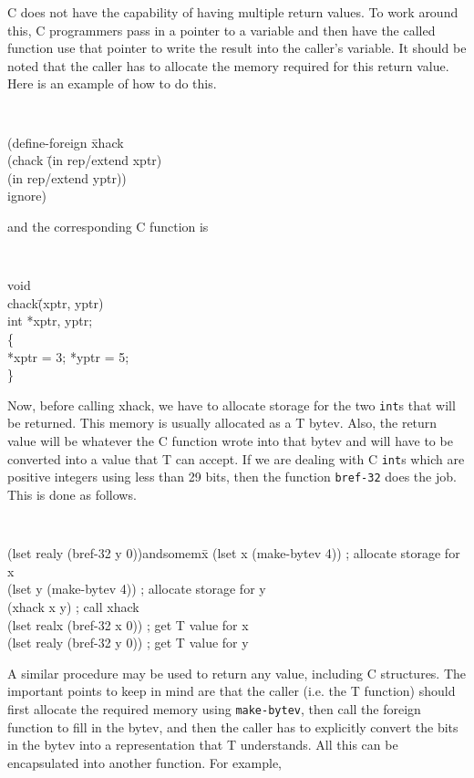 C does not have the capability of having multiple return values.
To work around this, C programmers pass in a pointer to a
variable and then have the called function use that pointer to write
the result into the caller's variable.
It should be noted that the caller has to allocate the memory required
for this return value.
Here is an example of how to do this.

\horizline
{\tt
\begin{tabbing}
(define-foreign \= xhack\+ \\
	(chack \= (in rep/extend xptr)\+ \\
		(in rep/extend yptr))\- \\
	ignore)
\end{tabbing}
}
\horizline

and the corresponding C function is

\horizline
{\tt
\begin{tabbing}
void\\
chack\= (xptr, yptr)\\
	\> int *xptr, yptr;\\
\{\\
	\> *xptr = 3; *yptr = 5;\\
\}
\end{tabbing}
}
\horizline

Now, before calling xhack, we have to allocate storage for the two
{\tt int}s that will be returned.
This memory is usually allocated as a T bytev.
Also, the return value will be whatever the C function wrote into that
bytev and will have to be converted into a value that T can accept.
If we are dealing with C {\tt int}s which are positive integers using
less than 29 bits, then the function {\tt bref-32} does the job.
This is done as follows.

\horizline
{\tt
\begin{tabbing}
(lset realy (bref-32 y 0))andsomemx\= \kill
(lset x (make-bytev 4))		\> ; allocate storage for x\\
(lset y (make-bytev 4))		\> ; allocate storage for y\\
(xhack x y)			\> ; call xhack\\
(lset realx (bref-32 x 0))	\> ; get T value for x\\
(lset realy (bref-32 y 0))	\> ; get T value for y
\end{tabbing}
}
\horizline

A similar procedure may be used to return
any value, including C structures.
The important points to keep in mind are that the caller (i.e. the T
function) should first allocate the required memory using
{\tt make-bytev}, then call the foreign function to fill in the
bytev, and then the caller has to explicitly convert the bits in the
bytev into a representation that T understands.
All this can be encapsulated into another function.
For example,

